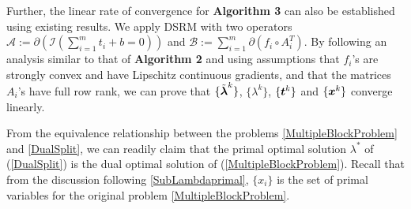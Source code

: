 \documentclass{mcom-l}
\theoremstyle{definition}
\theoremstyle{remark}
\numberwithin{equation}{section}
\begin{document}
{Further, the linear rate of convergence for {\bf{Algorithm 3}} can also be established using existing results. We apply DSRM with two operators ${\mathcal{A}}\!:=\!\partial ({\mathcal{I}}({\sum_{i=1}^m t_i \!+\! b \!=\! 0}))$ and ${\mathcal{B}}:= \sum_{i=1}^m \partial (f_i \circ A_i^T)$. By following an analysis similar to that of {\bf{Algorithm 2}} and using assumptions that $f_i$'s are strongly convex and have Lipschitz continuous gradients, and that the matrices $A_i$'s have full row rank, we can prove that $\{\tilde{{\mbox{\boldmath $\lambda$}}}^k\}$, $\{\lambda^k\}$, $\{{{\mbox{\boldmath $t$}}}^k\}$ and $\{{{\mbox{\boldmath $x$}}}^k\}$ converge linearly.

From the equivalence relationship between the problems \eqref{MultipleBlockProblem} and \eqref{DualSplit}, we can readily claim that the primal optimal solution $\lambda^*$ of (\ref{DualSplit}) is the dual optimal solution of (\ref{MultipleBlockProblem}).  Recall that from the discussion following \eqref{SubLambdaprimal}, $\{x_i\}$ is the set of primal variables for the original problem \eqref{MultipleBlockProblem}.

}
\end{document}
